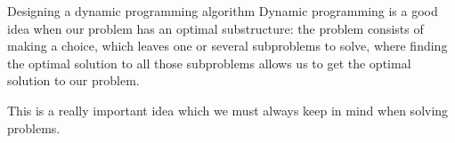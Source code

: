 \documentclass[a4paper]{article}
\begin{document}
\begin{parag}{Designing a dynamic programming algorithm}
    Dynamic programming is a good idea when our problem has an optimal substructure: the problem consists of making a choice, which leaves one or several subproblems to solve, where finding the optimal solution to all those subproblems allows us to get the optimal solution to our problem.

    This is a really important idea which we must always keep in mind when solving problems.
\end{parag}
\end{document}
